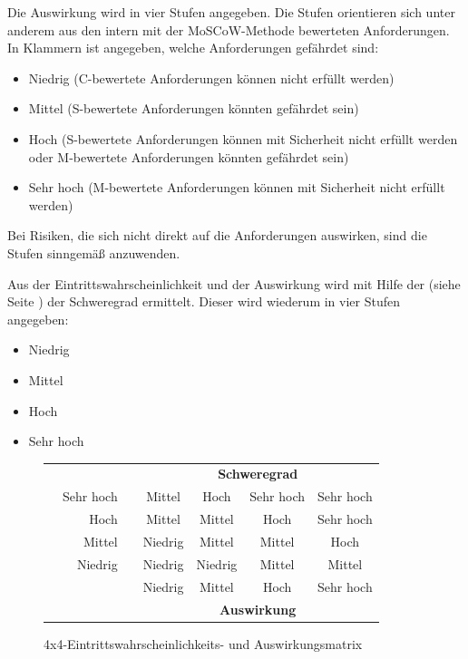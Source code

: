 \documentclass[a4paper,11pt,listof=numbered,glossary=totoc,parskip=half]{scrreprt}
\begin{document}
Die Auswirkung wird in vier Stufen angegeben. Die Stufen orientieren sich unter anderem aus den intern mit der MoSCoW-Methode bewerteten Anforderungen. In Klammern ist angegeben, welche Anforderungen gefährdet sind:
\begin{itemize}
	\item Niedrig (C-bewertete Anforderungen können nicht erfüllt werden)
	\item Mittel (S-bewertete Anforderungen könnten gefährdet sein)
	\item Hoch (S-bewertete Anforderungen können mit Sicherheit nicht erfüllt werden oder M-bewertete Anforderungen könnten gefährdet sein)
	\item Sehr hoch (M-bewertete Anforderungen können mit Sicherheit nicht erfüllt werden)
\end{itemize}
Bei Risiken, die sich nicht direkt auf die Anforderungen auswirken, sind die Stufen sinngemäß anzuwenden.

Aus der Eintrittswahrscheinlichkeit und der Auswirkung wird mit Hilfe der  (siehe Seite \pageref{fig:risiko}) der Schweregrad ermittelt. Dieser wird wiederum in vier Stufen angegeben:
\begin{itemize}
	\item Niedrig
	\item Mittel
	\item Hoch
	\item Sehr hoch
\end{itemize}

\begin{figure}
	\centering
	\renewcommand{\arraystretch}{2}	
	\begin{tabular}{rrccccc}	
		\arrayrulecolor{white}
		& & &  \multicolumn{4}{c}{\textbf{Schweregrad}} \\ 
		\multirow{4}{*}{\rotatebox{90}{\textbf{Wahrscheinlichkeit}}} &
		\cellcolor[HTML]{bee3d3}Sehr hoch&&  \cellcolor[HTML]{f79448} Mittel & \cellcolor[HTML]{f04e4d} Hoch & \cellcolor[HTML]{ce181e} Sehr hoch & \cellcolor[HTML]{ce181e}Sehr hoch \\
		&\cellcolor[HTML]{bee3d3}Hoch && \cellcolor[HTML]{f79448}Mittel & \cellcolor[HTML]{f79448}Mittel & \cellcolor[HTML]{f04e4d}Hoch & \cellcolor[HTML]{ce181e}Sehr hoch \\
		&\cellcolor[HTML]{bee3d3}Mittel &&\cellcolor[HTML]{fdb94d} Niedrig &\cellcolor[HTML]{f79448} Mittel &\cellcolor[HTML]{f79448} Mittel &\cellcolor[HTML]{f04e4d} Hoch \\
		&\cellcolor[HTML]{bee3d3}Niedrig && \cellcolor[HTML]{fdb94d}Niedrig &\cellcolor[HTML]{fdb94d} Niedrig & \cellcolor[HTML]{f79448}Mittel & \cellcolor[HTML]{f79448}Mittel \\ \cmidrule[6pt]{3-6}
		&&& \cellcolor[HTML]{c2e0ae}Niedrig & \cellcolor[HTML]{c2e0ae}Mittel & \cellcolor[HTML]{c2e0ae}Hoch & \cellcolor[HTML]{c2e0ae}Sehr hoch \\ 
		&&& \multicolumn{4}{c}{\textbf{Auswirkung}}
	\end{tabular}
	\caption{4x4-Eintrittswahrscheinlichkeits- und Auswirkungsmatrix}
	\label{fig:risiko}
\end{figure}
\end{document}

